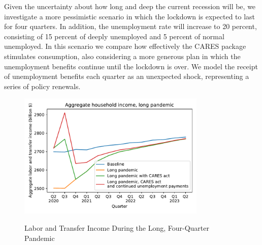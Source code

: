 \documentclass[titlepage]{\econtex}
\begin{document}
Given the uncertainty about how long and deep the current recession will be, we investigate a more pessimistic scenario in which the lockdown is expected to last for four quarters.  
In addition, the unemployment rate will increase to 20 percent, consisting of 15 percent of deeply unemployed and 5 percent of normal unemployed.  
In this scenario we compare how effectively the CARES package stimulates consumption, also considering a more generous plan in which the unemployment benefits continue until the lockdown is over.
We model the receipt of unemployment benefits each quarter as an unexpected shock, representing a series of policy renewals.

\begin{figure}
  \centering
  \caption{Labor and Transfer Income During the Long, Four-Quarter Pandemic}
  \label{inc_response_pandemic}
  { \includegraphics[width=0.8\textwidth]{./Figures/AggLT_long_pandemic}}
\end{figure}
\end{document}
